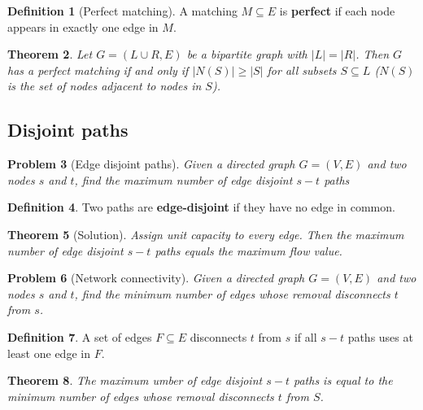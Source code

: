 \documentclass[10pt, oneside, reqno]{amsart}
\theoremstyle{plain}%
\newtheorem{thm}{Theorem}[section]
\newtheorem{prob}[thm]{Problem}
\theoremstyle{definition}
\newtheorem{defn}[thm]{Definition}
\theoremstyle{remark}
\begin{document}
\begin{defn}[Perfect matching]
	A matching $M \subseteq E$ is \textbf{perfect} if each node appears in exactly one edge in $M$.
\end{defn}

\begin{thm}
	Let $G = (L \cup R, E)$ be a bipartite graph with $|L| = |R|$.  Then $G$ has a perfect matching if and only if $|N(S)| \geq |S|$ for all subsets $S \subseteq L$ ($N(S)$ is the set of nodes adjacent to nodes in $S$).
\end{thm}


\subsection{Disjoint paths} %
\label{sub:disjoint_paths}

\begin{prob}[Edge disjoint paths]
	Given a directed graph $G = (V,E)$ and two nodes $s$ and $t$, find the maximum number of edge disjoint $s-t$ paths
\end{prob}

\begin{defn}
	Two paths are \textbf{edge-disjoint} if they have no edge in common.
\end{defn}

\begin{thm}[Solution]
	Assign unit capacity to every edge.  Then the maximum number of edge disjoint $s-t$ paths equals the maximum flow value.
\end{thm}

\begin{prob}[Network connectivity]
	Given a directed graph $G = (V,E)$ and two nodes $s$ and $t$, find the minimum number of edges whose removal disconnects $t$ from $s$.
\end{prob}

\begin{defn}
	A set of edges $F \subseteq E$ disconnects $t$ from $s$ if all $s-t$ paths uses at least one edge in $F$.
\end{defn}

\begin{thm}
	The maximum umber of edge disjoint $s-t$ paths is equal to the minimum number of edges whose removal disconnects $t$ from $S$.  
\end{thm}
\end{document}
